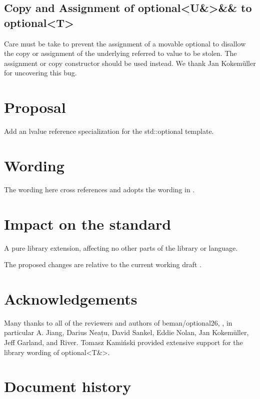 \documentclass[a4paper,10pt,oneside,openany,final,article]{memoir}
\begin{document}
\section{Copy and Assignment of optional<U\&>\&\& to optional<T>}
Care must be take to prevent the assignment of a movable optional to disallow the copy or assignment of the underlying referred to value to be stolen. The  assignment or copy constructor should be used instead. We thank Jan Kokemüller for uncovering this bug.


\chapter{Proposal}

Add an lvalue reference specialization for the std::optional template.

\chapter{Wording}

The wording here cross references and adopts the wording in \cite{P3091R2}.


\begin{wording}



\end{wording}

\chapter{Impact on the standard}

A pure library extension, affecting no other parts of the library or language.

The proposed changes are relative to the current working draft \cite{N4910}.

\chapter{Acknowledgements}
Many thanks to all of the reviewers and authors of beman/optional26, \cite{The_Beman_Project_beman_optional26}, in particular A. Jiang, Darius Neațu, David Sankel, Eddie Nolan, Jan Kokemüller, Jeff Garland, and River. Tomasz Kamiński provided extensive support for the library wording of optional<T\&>.


\chapter*{Document history}
\end{document}

